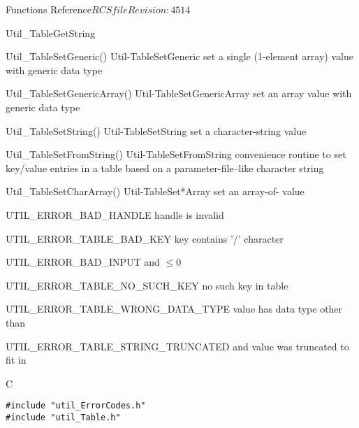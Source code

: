 \begin{cactuspart}{ Functions Reference}{$RCSfile$}{$Revision: 4514 $}
\begin{FunctionDescription}{Util\_TableGetString}
\begin{SeeAlsoSection}
\begin{SeeAlso2} {Util\_TableSetGeneric()} {Util-TableSetGeneric}
set a single (1-element array) value with generic data type
\end{SeeAlso2}
\begin{SeeAlso2} {Util\_TableSetGenericArray()} {Util-TableSetGenericArray}
set an array value with generic data type
\end{SeeAlso2}
\begin{SeeAlso2} {Util\_TableSetString()} {Util-TableSetString}
set a character-string value
\end{SeeAlso2}
\begin{SeeAlso2} {Util\_TableSetFromString()} {Util-TableSetFromString}
convenience routine to set key/value entries in a table based on a
parameter-file--like character string
\end{SeeAlso2}
\begin{SeeAlso2} {Util\_TableSetCharArray()} {Util-TableSet*Array}
set an array-of- value
\end{SeeAlso2}
\end{SeeAlsoSection}

\begin{ErrorSection}
\begin{Error}{UTIL\_ERROR\_BAD\_HANDLE}
handle is invalid
\end{Error}
\begin{Error}{UTIL\_ERROR\_TABLE\_BAD\_KEY}
key contains '/' character
\end{Error}
\begin{Error}{UTIL\_ERROR\_BAD\_INPUT}
 and  $\le 0$
\end{Error}
\begin{Error}{UTIL\_ERROR\_TABLE\_NO\_SUCH\_KEY}
no such key in table
\end{Error}
\begin{Error}{UTIL\_ERROR\_TABLE\_WRONG\_DATA\_TYPE}
value has data type other than 
\end{Error}
\begin{Error}{UTIL\_ERROR\_TABLE\_STRING\_TRUNCATED}
\quad
{} and value was truncated to fit in 
\end{Error}
\end{ErrorSection}

\begin{ExampleSection}
\begin{Example}{C}
\begin{verbatim}
#include "util_ErrorCodes.h"
#include "util_Table.h"


\end{verbatim}
\end{Example}
\end{ExampleSection}
\end{FunctionDescription}
\end{cactuspart}
